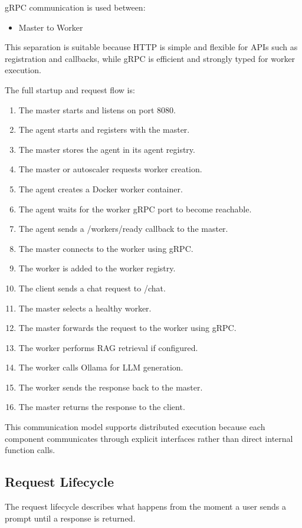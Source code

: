 gRPC communication is used between:
\begin{itemize}[leftmargin=1.5em]
  \item Master to Worker
\end{itemize}

This separation is suitable because HTTP is simple and flexible for APIs such as registration and callbacks, while gRPC is efficient and strongly typed for worker execution.

The full startup and request flow is:
\begin{enumerate}[leftmargin=1.8em]
  \item The master starts and listens on port 8080.
  \item The agent starts and registers with the master.
  \item The master stores the agent in its agent registry.
  \item The master or autoscaler requests worker creation.
  \item The agent creates a Docker worker container.
  \item The agent waits for the worker gRPC port to become reachable.
  \item The agent sends a /workers/ready callback to the master.
  \item The master connects to the worker using gRPC.
  \item The worker is added to the worker registry.
  \item The client sends a chat request to /chat.
  \item The master selects a healthy worker.
  \item The master forwards the request to the worker using gRPC.
  \item The worker performs RAG retrieval if configured.
  \item The worker calls Ollama for LLM generation.
  \item The worker sends the response back to the master.
  \item The master returns the response to the client.
\end{enumerate}

This communication model supports distributed execution because each component communicates through explicit interfaces rather than direct internal function calls.

\subsection{Request Lifecycle}
The request lifecycle describes what happens from the moment a user sends a prompt until a response is returned.

